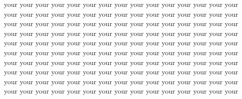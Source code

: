 your your your your your your your your your your your your your your your your your your your your your your your your your your your your your your\\
your your your your your your your your your your your your your your your your your your your your your your your your your your your your your your\\
your your your your your your your your your your your your your your your your your your your your your your your your your your your your your your\\
your your your your your your your your your your your your your your your your your your your your your your your your your your your your your your\\
your your your your your your your your your your your your your your your your your your your your your your your your your your your your your your\\
